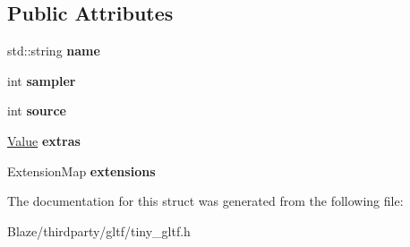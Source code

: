 \subsection*{Public Attributes}
\begin{DoxyCompactItemize}
\item 
\mbox{\label{structtinygltf_1_1Texture_a276c9e7655db607bea998d0863b284f1}} 
std\+::string {\bfseries name}
\item 
\mbox{\label{structtinygltf_1_1Texture_a06dff2bdb51b1ff95776a96f422380cf}} 
int {\bfseries sampler}
\item 
\mbox{\label{structtinygltf_1_1Texture_a48ed797af78294b1e70f4d2f5ea8a995}} 
int {\bfseries source}
\item 
\mbox{\label{structtinygltf_1_1Texture_a2ff460f0d0870334ba16ca09419c528c}} 
\hyperlink{classtinygltf_1_1Value}{Value} {\bfseries extras}
\item 
\mbox{\label{structtinygltf_1_1Texture_acf78a8da70b3097735db86559d410a82}} 
Extension\+Map {\bfseries extensions}
\end{DoxyCompactItemize}


The documentation for this struct was generated from the following file\+:\begin{DoxyCompactItemize}
\item 
Blaze/thirdparty/gltf/tiny\+\_\+gltf.\+h\end{DoxyCompactItemize}
